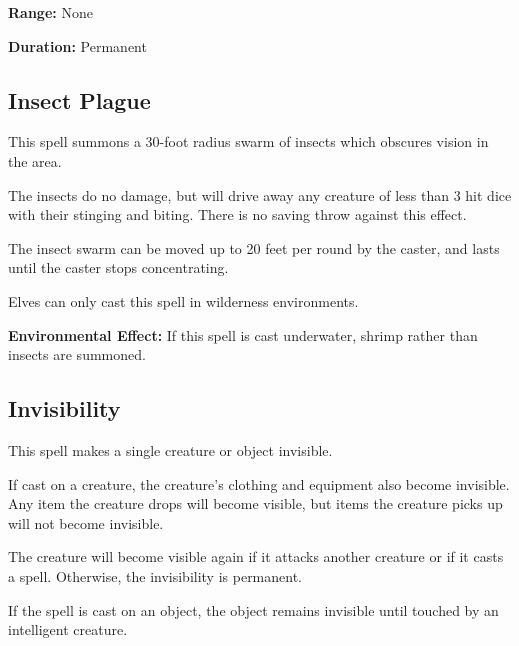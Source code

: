 \begin{multicols*}{2}
{\textbf{Range:} None

\textbf{Duration:} Permanent}



\subsection{Insect Plague}\label{spell:Insect Plague}

This spell summons a 30-foot radius swarm of insects which obscures vision in the area.

The insects do no damage, but will drive away any creature of less than 3 hit dice with their stinging and biting. There is no saving throw against this effect.

The insect swarm can be moved up to 20 feet per round by the caster, and lasts until the caster stops concentrating.

Elves can only cast this spell in wilderness environments.

\textbf{Environmental Effect:} If this spell is cast underwater, shrimp rather than insects are summoned.

\subsection{Invisibility}\label{spell:Invisibility}

This spell makes a single creature or object invisible.

If cast on a creature, the creature’s clothing and equipment also become invisible. Any item the creature drops will become visible, but items the creature picks up will not become invisible.

The creature will become visible again if it attacks another creature or if it casts a spell. Otherwise, the invisibility is permanent.

If the spell is cast on an object, the object remains invisible until touched by an intelligent creature.


\end{multicols*}
